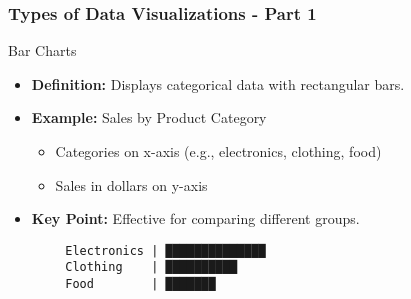 \documentclass[aspectratio=169]{beamer}
\begin{document}
\begin{frame}[fragile]
    \frametitle{Types of Data Visualizations - Part 1}
    \begin{block}{Bar Charts}
        \begin{itemize}
            \item \textbf{Definition:} Displays categorical data with rectangular bars.
            \item \textbf{Example:} Sales by Product Category
            \begin{itemize}
                \item Categories on x-axis (e.g., electronics, clothing, food)
                \item Sales in dollars on y-axis
            \end{itemize}
            \item \textbf{Key Point:} Effective for comparing different groups.
        \end{itemize}
        \begin{lstlisting}
        Electronics | ██████████████
        Clothing    | ██████████
        Food        | ███████
        \end{lstlisting}
    \end{block}
\end{frame}
\end{document}
